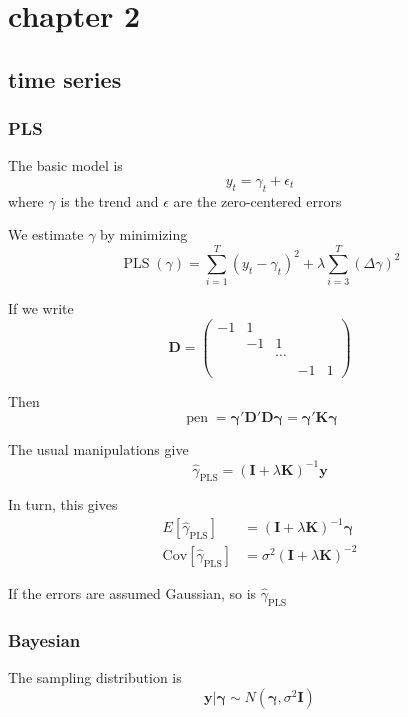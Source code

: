 \documentclass{article}
\begin{document}
    \section{chapter 2}
    \subsection{time series}
    \subsubsection{PLS}
    The basic model is
    \[y_t = \gamma_t + \epsilon_t \]
    where \(\gamma\) is the trend and \(\epsilon\) are the zero-centered errors 
    
    We estimate \(\gamma\) by minimizing 
    \[\operatorname{PLS} (\gamma) = \sum_{i =1}^T (y_t - \gamma_t)^2 + \lambda \sum_{i = 3}^T (\Delta \gamma)^2 \]

    If we write 
    \[\mathbf D = \left(\begin{matrix}
        -1 & 1 & & & \\
        & -1 & 1 & & \\
        &&\cdots&& \\
        &&& -1 & 1 
    \end{matrix}\right)\]

    Then 
    \[\operatorname{pen} = \boldsymbol \gamma ' \mathbf D ' \mathbf D \boldsymbol \gamma = \boldsymbol \gamma ' \mathbf K \boldsymbol \gamma\]

    The usual manipulations give 
    \[\hat \gamma_{\text{PLS}} = (\mathbf I + \lambda \mathbf K)^{-1} \mathbf y\]

    In turn, this gives 
    \begin{align*}
        E[\hat \gamma_{\text{PLS}}] &= (\mathbf I + \lambda \mathbf K)^{-1} \boldsymbol \gamma \\
        \text{Cov}[\hat \gamma_{\text{PLS}}] &= \sigma^2 (\mathbf I+ \lambda \mathbf K)^{-2}
    \end{align*}

    If the errors are assumed Gaussian, so is \(\hat \gamma_{\text{PLS}}\)

    \subsubsection{Bayesian}
    
    The sampling distribution is 
    \[ \mathbf y | \boldsymbol \gamma \sim N(\boldsymbol\gamma, \sigma^2 \mathbf I)\]
\end{document}
